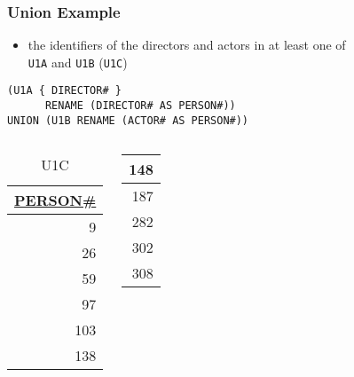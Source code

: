 \documentclass[dvipsnames]{beamer}
\theoremstyle{plain}
\begin{document}
\begin{frame}[fragile]
  \frametitle{Union Example}

  \begin{example}
    \begin{itemize}
      \item the identifiers of the directors and actors in at least one of\\
        \texttt{U1A} and \texttt{U1B} (\texttt{U1C})
    \end{itemize}

    \begin{lstlisting}
(U1A { DIRECTOR# }
      RENAME (DIRECTOR# AS PERSON#))
UNION (U1B RENAME (ACTOR# AS PERSON#))
    \end{lstlisting}

    \pause
    \vspace{-10pt}
    \begin{columns}[b]
      \begin{tiny}
      \begin{table}
        \caption{U1C}
        \begin{tabular}{|r|}\hline
\underline{PERSON\#}\\[2pt]\hline\hline
                  9\\\hline
                 26\\\hline
                 59\\\hline
                 97\\\hline
                103\\\hline
                138\\\hline
        \end{tabular}
      \end{table}
      \end{tiny}

      \begin{tiny}
      \begin{table}
        \begin{tabular}{|r|}\hline
                148\\\hline
                187\\\hline
                282\\\hline
                302\\\hline
                308\\\hline
        \end{tabular}
      \end{table}
      \end{tiny}


\end{columns}
\end{example}
\end{frame}
\end{document}

